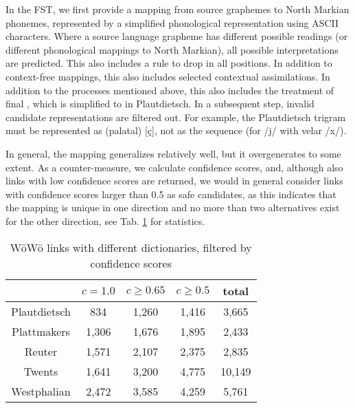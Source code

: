 In the FST, we first provide a mapping from source graphemes to North Markian phonemes, represented by a simplified phonological representation using ASCII characters. Where a source language grapheme has different possible readings (or different phonological mappings to North Markian), all possible interpretations are predicted. This also includes a rule to drop  in all positions. In addition to context-free mappings, this also includes selected contextual assimilations. In addition to the processes mentioned above, this also includes the treatment of final , which is simplified to  in Plautdietsch. In a subsequent step, invalid candidate representations are filtered out. For example, the Plautdietsch trigram  must be represented as (palatal)  [ç], not as the sequence  (for /j/ with velar /x/).

In general, the mapping generalizes relatively well, but it overgenerates to some extent. As a counter-measure, we calculate confidence scores, and, although also links with low confidence scores are returned, we would in general consider links with confidence scores larger than 0.5 as safe candidates, as this indicates that the mapping is unique in one direction and no more than two alternatives exist for the other direction, see Tab. \ref{tab-results} for statistics.



\begin{table}
{\small
\begin{tabular}{ccccc}
                & $c=1.0$   & $c\geq 0.65$  & $c \geq 0.5$  & total \\ \hline
Plautdietsch    & 834       & 1,260          & 1,416          & 3,665 \\
Plattmakers     & 1,306     & 1,676          & 1,895          & 2,433 \\
Reuter          & 1,571     & 2,107          & 2,375          & 2,835 \\
Twents          & 1,641     & 3,200          & 4,775          & 10,149\\
Westphalian     & 2,472     & 3,585          & 4,259          & 5,761 \\
\hline
\end{tabular}
} %
\caption{WöWö links with different dictionaries, filtered by confidence scores}
\label{tab-results}
\end{table}

